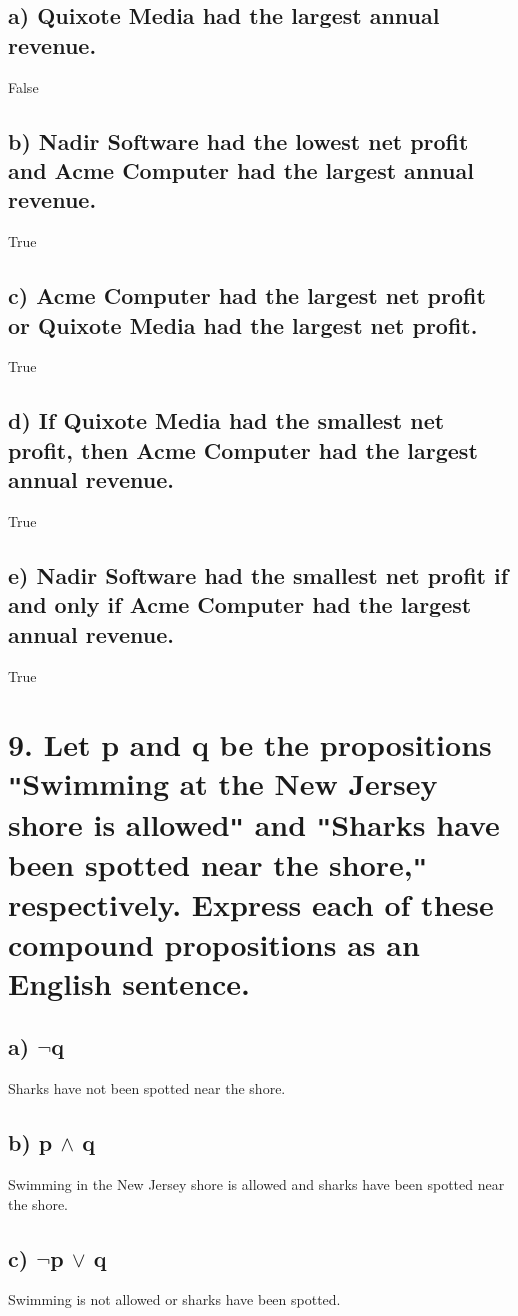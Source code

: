 \documentclass[11pt, oneside]{article} %
\numberwithin{equation}{section} %
\numberwithin{figure}{section} %
\begin{document}
\subsection{a) Quixote Media had the largest annual revenue.}
False
\subsection{b) Nadir Software had the lowest net profit and Acme Computer had the largest annual revenue.}
True
\subsection{c) Acme Computer had the largest net profit or Quixote Media had the largest net profit.}
True
\subsection{d) If Quixote Media had the smallest net profit, then Acme Computer had the largest annual revenue.}
True
\subsection{e) Nadir Software had the smallest net profit if and only if Acme Computer had the largest annual revenue.}
True


\section{9. Let p and q be the propositions \texttt{"}Swimming at the New Jersey shore is allowed\texttt{"} and \texttt{"}Sharks have been spotted near the shore,\texttt{"} respectively. Express each of these compound propositions as an English sentence.}
\subsection{a) $\neg$q}
Sharks have not been spotted near the shore.
\subsection{b) p $\wedge$ q}
Swimming in the New Jersey shore is allowed and sharks have been spotted near the shore.
\subsection{c) $\neg$p $\vee$ q}
Swimming is not allowed or sharks have been spotted.
\end{document}
